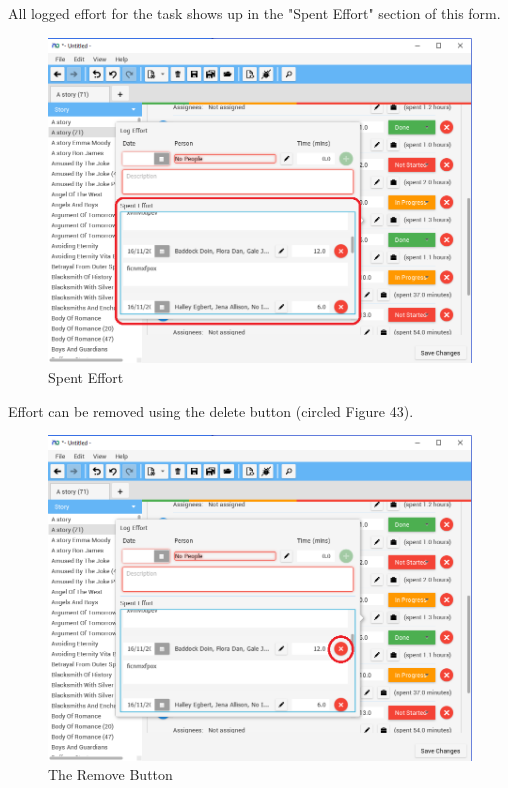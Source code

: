 All logged effort for the task shows up in the "Spent Effort" section of this form. 

\begin{figure}[H]
\centering
\includegraphics[width=\textwidth]{images/screenshots/logging4.png}
\caption{Spent Effort}
\label{fig:new_project}
\end{figure}

Effort can be removed using the delete button (circled Figure 43).

\begin{figure}[H]
\centering
\includegraphics[width=\textwidth]{images/screenshots/logging5.png}
\caption{The Remove Button}
\label{fig:new_project}
\end{figure}